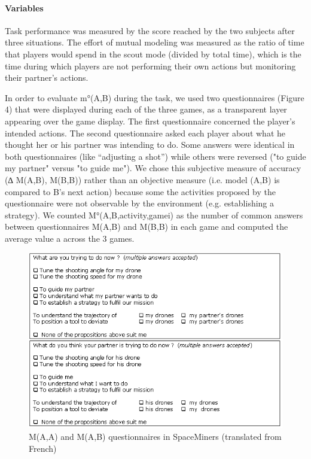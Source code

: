 \documentclass[twocolumn]{article}
\begin{document}
\paragraph{Variables}

Task performance was measured by the score reached by the two subjects after
three situations. The effort of mutual modeling was measured as the ratio of
time that players would spend in the scout mode (divided by total time), which
is the time during which players are not performing their own actions but
monitoring their partner's actions.

In order to evaluate m°(A,B) during the task, we used two questionnaires (Figure
4) that were displayed during each of the three games, as a transparent layer
appearing over the game display. The first questionnaire concerned the player’s
intended actions. The second questionnaire asked each player about what he
thought her or his partner was intending to do. Some answers were identical in
both questionnaires (like “adjusting a shot”) while others were reversed ("to
guide my partner" versus "to guide me"). We chose this subjective measure of
accuracy (∆ M(A,B), M(B,B)) rather than an objective measure (i.e. model (A,B)
is compared to B's next action) because some the activities proposed by the
questionnaire were not observable by the environment (e.g. establishing a
strategy). We counted M°(A,B,activity,gamei) as the number of common answers
between questionnaires M(A,B) and M(B,B) in each game and computed the average
value a across the 3 games.

\begin{figure}[ht!]
        \centering
        \includegraphics[width=\columnwidth]{image5.png}
        \caption{M(A,A) and M(A,B) questionnaires in SpaceMiners (translated
        from French)}
        \label{study1:questionnaires}
\end{figure}
\end{document}
